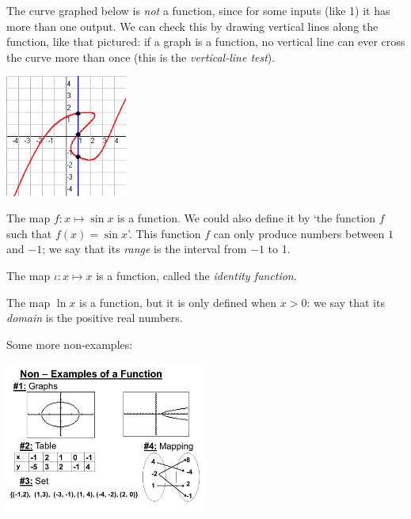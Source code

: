 \begin{ex}
  The curve graphed below is \textit{not} a function, since for some inputs (like 1) it has more than one output. We can check this
  by drawing vertical lines along the function, like that pictured: if a graph is a function, no vertical line can ever cross the curve
  more than once (this is the \textit{vertical-line test}).

  \begin{center}
    \includegraphics[width=0.3\textwidth]{linetest}
  \end{center}
\end{ex}

\begin{ex}
  The map $ f : x \mapsto \sin x $ is a function. We could also define it by `the function $ f $ such that $ f(x) = \sin x $'.
  This function $ f $ can only produce numbers between $1$ and $-1$; we say that its \textit{range} is the interval from $ -1 $ to 1.
\end{ex}

\begin{ex}
  The map $ \iota : x \mapsto x $ is a function, called the \textit{identity function}.
\end{ex}

\begin{ex}
  The map $ \ln x $ is a function, but it is only defined when $ x > 0 $: we say that its \textit{domain} is the positive real numbers.
\end{ex}

\clearpage
\begin{ex}
  Some more non-examples:

  \begin{center}
    \includegraphics[width=0.5\textwidth]{notfunction}
  \end{center}
\end{ex}

